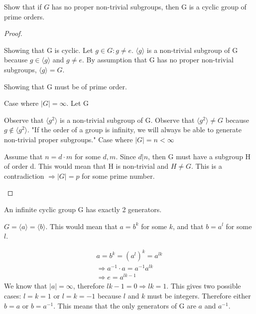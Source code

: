 \documentclass[class=scrartcl, crop=false]{standalone}
\begin{document}
\begin{exercise}
  Show that if $G$ has no proper non-trivial subgroups, then G is a cyclic group of prime orders.
  \begin{proof}
    \begin{enumerate}[label=(\alph*)]
      \ii[]
      \ii
      Showing that G is cyclic. Let $g \in G: g \neq e$. $\langle g \rangle$ is a non-trivial subgroup of G because $g \in \langle g \rangle$ and $g \neq e$. By assumption that G has no proper non-trivial subgroups, $\langle g \rangle = G$.

      \ii
      Showing that G must be of prime order.
      \begin{enumerate}
        \ii
        Case where $|G| = \infty$. Let G

        Observe that $\langle g^2 \rangle$ is a non-trivial subgroup of G.
        Observe that $\langle g^2 \rangle \neq G$ because $g \notin \langle g^2 \rangle$.
        "If the order of a group is infinity, we will always be able to generate non-trivial proper subgroups."
        \ii
        Case where $|G| = n < \infty$

        Assume that $n = d \cdot m$ for some $d, m$. Since $d | n$, then G must have a subgroup H of order d. This would mean that H is non-trivial and $H \neq G$. This is a contradiction $\Rightarrow |G| = p$ for some prime number.
      \end{enumerate}
  
    \end{enumerate}
  \end{proof}
\end{exercise}

\begin{exercise}
  An infinite cyclic group G has exactly 2 generators.

  $G = \langle a \rangle = \langle b \rangle$. This would mean that $a = b^k$ for some $k$, and that $b = a^l$ for some $l$.

   \begin{gather*}
     a = b^k = (a^l)^k = a^{lk} \\
     \Rightarrow a^{-1} \cdot a = a^{-1} a^{lk} \\
     \Rightarrow e = a^{lk - 1}
  \end{gather*}
  We know that $|a| = \infty$, therefore $lk - 1 = 0 \Rightarrow lk = 1$. This gives two possible cases: $l = k = 1$ or $l = k = -1$ because $l$ and $k$ must be integers. Therefore either $b = a$ or $b = a^{-1}$. This means that the only generators of G are $a$ and $a^{-1}$.
\end{exercise}
\end{document}
